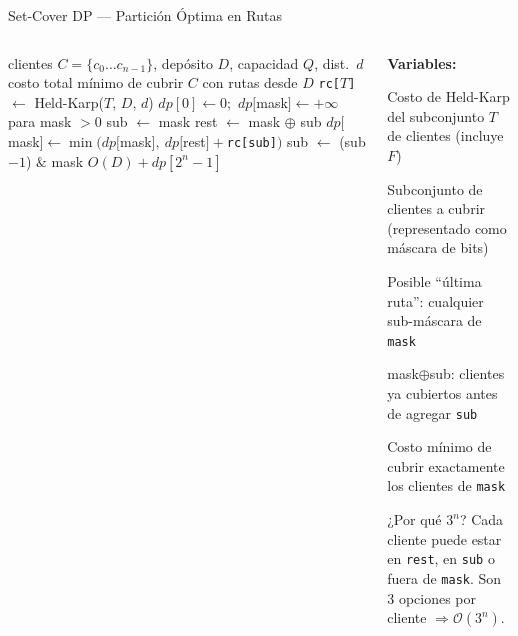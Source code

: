 \documentclass[aspectratio=169,10pt]{beamer}
\begin{document}
\begin{frame}{Set-Cover DP --- Partición Óptima en Rutas}
  \begin{columns}[T,onlytextwidth]
    \begin{column}{0.54\textwidth}
      \begin{algorithm}[H]
        \caption{\small Set-Cover: mínimo costo para cubrir todos los clientes}
        \begin{algorithmic}[1]\tiny
          \Require clientes $C{=}\{c_0\ldots c_{n-1}\}$, depósito $D$, capacidad $Q$, dist.\ $d$
          \Ensure  costo total mínimo de cubrir $C$ con rutas desde $D$
            \State \texttt{rc[$T$]} $\gets$ Held-Karp($T$, $D$, $d$)
          \EndFor
          \State $dp[0] \gets 0$;\ $dp[$mask$] \gets +\infty$ para mask $> 0$
            \State sub $\gets$ mask
                \State rest $\gets$ mask $\oplus$ sub
                \State $dp[$mask$] \gets \min\bigl(dp[$mask$],\ dp[$rest$]+$\texttt{rc[sub]}$\bigr)$
              \EndIf
              \State sub $\gets$ (sub${-}1$) $\&$ mask
            \EndWhile
          \EndFor
          \State \Return $O(D) + dp[2^n{-}1]$
        \end{algorithmic}
      \end{algorithm}
    \end{column}
    \begin{column}{0.44\textwidth}
      \textbf{Variables:}
      \vspace{0.2em}
      \begin{description}[\texttt{dp[mask]}]\footnotesize
        \item[\texttt{rc[T]}] Costo de Held-Karp del subconjunto $T$ de clientes (incluye $F$)
        \item[\texttt{mask}] Subconjunto de clientes a cubrir (representado como máscara de bits)
        \item[\texttt{sub}] Posible ``última ruta'': cualquier sub-máscara de \texttt{mask}
        \item[\texttt{rest}] mask\;$\oplus$\;sub: clientes ya cubiertos antes de agregar \texttt{sub}
        \item[\texttt{dp[mask]}] Costo mínimo de cubrir exactamente los clientes de \texttt{mask}
      \end{description}
      \vspace{0.3em}
      \begin{alertblock}{¿Por qué $3^n$?}\footnotesize
        Cada cliente puede estar en \texttt{rest}, en \texttt{sub} o fuera de \texttt{mask}. Son 3 opciones por cliente $\Rightarrow \mathcal{O}(3^n)$.
      \end{alertblock}
    \end{column}
  \end{columns}
\end{frame}
\end{document}
